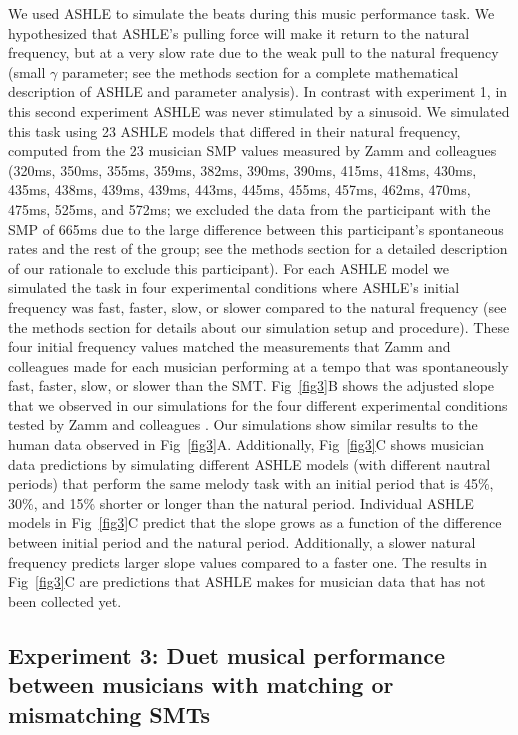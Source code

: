 \documentclass[10pt,letterpaper]{article}
\begin{document}
We used ASHLE to simulate the beats during this music performance task. We hypothesized that ASHLE's pulling force will make it return to the natural frequency, but at a very slow rate due to the weak pull to the natural frequency (small $\gamma$ parameter; see the methods section for a complete mathematical description of ASHLE and parameter analysis). In contrast with experiment 1, in this second experiment ASHLE was never stimulated by a sinusoid. We simulated this task using 23 ASHLE models that differed in their natural frequency, computed from the 23 musician SMP values measured by Zamm and colleagues \cite{zamm2018musicians} (320ms, 350ms, 355ms, 359ms, 382ms, 390ms, 390ms, 415ms, 418ms, 430ms, 435ms, 438ms, 439ms, 439ms, 443ms, 445ms, 455ms, 457ms, 462ms, 470ms, 475ms, 525ms, and 572ms; we excluded the data from the participant with the SMP of 665ms due to the large difference between this participant's spontaneous rates and the rest of the group; see the methods section for a detailed description of our rationale to exclude this participant). For each ASHLE model we simulated the task in four experimental conditions where ASHLE's initial frequency was fast, faster, slow, or slower compared to the natural frequency (see the methods section for details about our simulation setup and procedure). These four initial frequency values matched the measurements that Zamm and colleagues \cite{zamm2018musicians} made for each musician performing at a tempo that was spontaneously fast, faster, slow, or slower than the SMT. Fig~\ref{fig3}B shows the adjusted slope that we observed in our simulations for the four different experimental conditions tested by Zamm and colleagues \cite{zamm2018musicians}. Our simulations show similar results to the human data observed in Fig~\ref{fig3}A. Additionally, Fig~\ref{fig3}C shows musician data predictions by simulating different ASHLE models (with different nautral periods) that perform the same melody task with an initial period that is 45\%, 30\%, and 15\% shorter or longer than the natural period. Individual ASHLE models in Fig~\ref{fig3}C predict that the slope grows as a function of the difference between initial period and the natural period. Additionally, a slower natural frequency predicts larger slope values compared to a faster one. The results in Fig~\ref{fig3}C are predictions that ASHLE makes for musician data that has not been collected yet.

\subsection*{Experiment 3: Duet musical performance between musicians with matching or mismatching SMTs}
\end{document}
